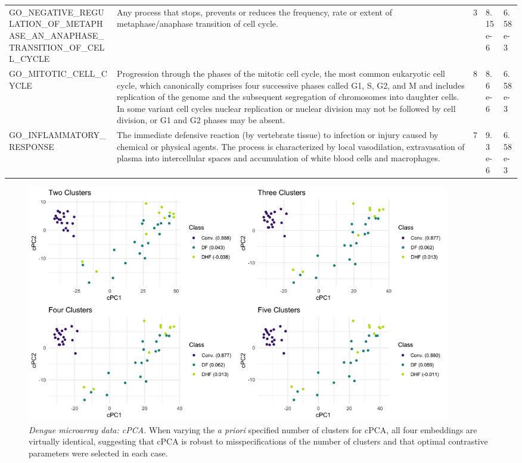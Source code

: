 \documentclass{article}
\begin{document}
\begin{table}
\begin{tabular}{|p{5cm} | p{6cm} | p{1.5cm} | p{1.5cm} | p{1.5cm}|}
  GO\_NEGATIVE\_REGULATION\_OF\_METAPHASE\_AN\newline\_ANAPHASE\_TRANSITION\newline\_OF\_CELL\_CYCLE & Any process that stops, prevents or reduces the frequency, rate or extent of metaphase/anaphase transition of cell cycle. & 3 & 8.15 e-6 & 6.58 e-3 \\
  GO\_MITOTIC\_CELL\_CYCLE & Progression through the phases of the mitotic cell cycle, the most common eukaryotic cell cycle, which canonically comprises four successive phases called G1, S, G2, and M and includes replication of the genome and the subsequent segregation of chromosomes into daughter cells. In some variant cell cycles nuclear replication or nuclear division may not be followed by cell division, or G1 and G2 phases may be absent. & 8 & 8.6 e-6 & 6.58 e-3 \\
  GO\_INFLAMMATORY\_RESPONSE & The immediate defensive reaction (by vertebrate tissue) to infection or injury caused by chemical or physical agents. The process is characterized by local vasodilation, extravasation of plasma into intercellular spaces and accumulation of white blood cells and macrophages. & 7 & 9.3 e-6 & 6.58 e-3 \\
 \hline
\end{tabular}
\label{tab:gsea_dengue}
\end{table}


\begin{figure}[!htbp]
    \centering
    \includegraphics[width=0.9\textwidth]{figures/dengue_cpca_centers}
    \caption{
    {\em Dengue microarray data: cPCA.}
    When varying the \textit{a priori} specified number of clusters for cPCA, all four embeddings are virtually identical, suggesting that cPCA is robust to misspecifications of the number of clusters and that optimal contrastive parameters were selected in each case.}
    \label{fig:dengue_cpca_centers}
\end{figure}
\end{document}
